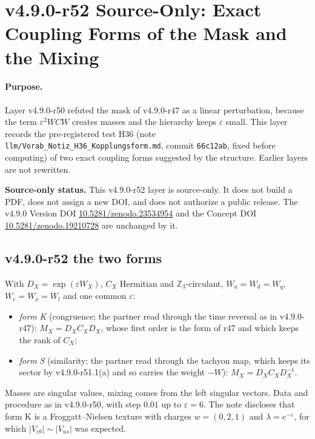 \clearpage
\section*{v4.9.0-r52 Source-Only: Exact Coupling Forms of the Mask and the Mixing}
\label{sec:v490-r52-coupling-forms}

\paragraph{Purpose.}
Layer v4.9.0-r50 refuted the mask of v4.9.0-r47 as a linear perturbation, because the term \(\varepsilon^2WCW\) creates masses and the hierarchy
keeps \(\varepsilon\) small.  This layer records the pre-registered test H36 (note \texttt{llm/Vorab\_Notiz\_H36\_Kopplungsform.md}, commit
\texttt{66c12ab}, fixed before computing) of two exact coupling forms suggested by the structure.  Earlier layers are not rewritten.

\noindent\textbf{Source-only status.}
This v4.9.0-r52 layer is source-only.  It does not build a PDF, does not assign a new DOI,
and does not authorize a public release.  The v4.9.0 Version DOI
\href{https://doi.org/10.5281/zenodo.23534954}{10.5281/zenodo.23534954} and the Concept DOI
\href{https://doi.org/10.5281/zenodo.19210728}{10.5281/zenodo.19210728} are unchanged by it.

\subsection*{v4.9.0-r52 the two forms}
\label{subsec:v490-r52-forms}

With \(D_X=\exp(\varepsilon W_X)\), \(C_X\) Hermitian and \(\mathbb Z_3\)-circulant, \(W_u=W_d=W_q\), \(W_e=W_\nu=W_l\) and one common
\(\varepsilon\):
\begin{itemize}[leftmargin=2em]
\item \emph{form K} (congruence; the partner read through the time reversal as in v4.9.0-r47): \(M_X=D_XC_XD_X\), whose first order is the form of
r47 and which keeps the rank of \(C_X\);
\item \emph{form S} (similarity; the partner read through the tachyon map, which keeps its sector by v4.9.0-r51.1(a) and so carries the weight
\(-W\)): \(M_X=D_XC_XD_X^{-1}\).
\end{itemize}
Masses are singular values, mixing comes from the left singular vectors.  Data and procedure as in v4.9.0-r50, with step \(0.01\) up to
\(\varepsilon=6\).  The note discloses that form K is a Froggatt--Nielsen texture with charges \(w=(0,2,1)\) and \(\lambda=e^{-\varepsilon}\), for
which \(|V_{cb}|\sim|V_{us}|\) was expected.

